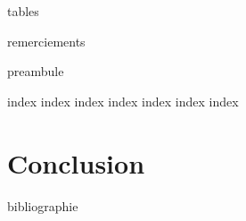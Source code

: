 


\frontmatter


{tables}

\printglossary

{remerciements}

{preambule}

\mainmatter

{index}
{index}
{index}
{index}
{index}
{index}
{index}

\chapter{Conclusion}


\backmatter

{bibliographie}


\newcommand\listfigurenameappendixes{\listfigurename}
\newcommand\listtablenameappendixes{\listtablename}

\appendixFix

\begin{appendices}
    
\end{appendices}

